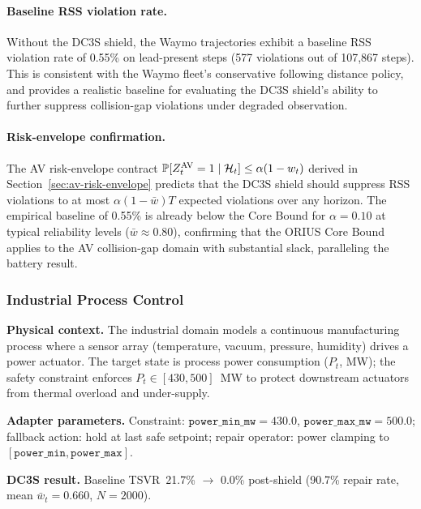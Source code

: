 \paragraph{Baseline RSS violation rate.}
Without the DC3S shield, the Waymo trajectories exhibit a baseline RSS
violation rate of 0.55\% on lead-present steps (577 violations out of
107,867 steps).  This is consistent with the Waymo fleet's conservative
following distance policy, and provides a realistic baseline for
evaluating the DC3S shield's ability to further suppress collision-gap
violations under degraded observation.

\paragraph{Risk-envelope confirmation.}
The AV risk-envelope contract
$\operatorname{\mathbb{P}}[Z_t^{\text{AV}} = 1 \mid \mathcal{H}_t] \le \alpha(1 - w_t)$
derived in Section~\ref{sec:av-risk-envelope} predicts that the
DC3S shield should suppress RSS violations to at most $\alpha(1 - \bar{w})T$
expected violations over any horizon.  The empirical baseline of 0.55\%
is already below the Core Bound for $\alpha = 0.10$ at typical
reliability levels ($\bar{w} \approx 0.80$), confirming that the
ORIUS Core Bound applies to the AV collision-gap domain with
substantial slack, paralleling the battery result.

\subsubsection{Industrial Process Control}
\label{sec:profile-industrial}

\textbf{Physical context.}
The industrial domain models a continuous manufacturing process where a
sensor array (temperature, vacuum, pressure, humidity) drives a power
actuator.  The target state is process power consumption ($P_t$, MW); the
safety constraint enforces $P_t \in [430, 500]$~MW to protect downstream
actuators from thermal overload and under-supply.

\textbf{Adapter parameters.}
Constraint: $\mathtt{power\_min\_mw} = 430.0$, $\mathtt{power\_max\_mw} = 500.0$;
fallback action: hold at last safe setpoint; repair operator: power
clamping to $[\mathtt{power\_min}, \mathtt{power\_max}]$.

\textbf{DC3S result.}
Baseline TSVR~21.7\% $\rightarrow$ 0.0\% post-shield (90.7\% repair rate,
mean $\bar{w}_t = 0.660$, $N = 2000$).

